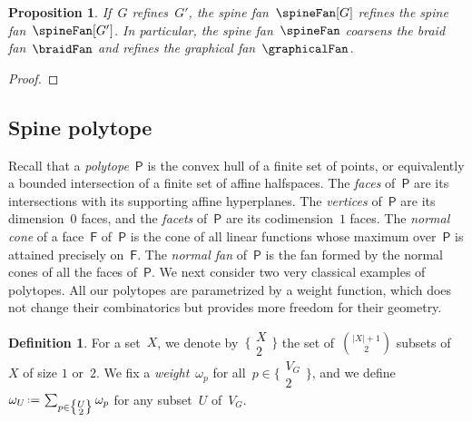 \documentclass{amsart}
\newtheorem{proposition}[theorem]{Proposition}
\theoremstyle{definition}
\newtheorem{definition}[theorem]{Definition}
\newcommand{\eqdef}{\mbox{\,\raisebox{0.2ex}{\scriptsize\ensuremath{\mathrm:}}\ensuremath{=}\,}} %
\newcommand{\darkblue}{\color{darkblue}} %
\newcommand{\defn}[1]{\textsl{\darkblue #1}} %
\newcommand{\vincent}[1]{\todo[color=blue!30]{#1 \\ \hfill --- V.}}
\newcommand{\polytope}[1]{\mathsf{#1}} %
\newcommand{\weight}{\omega} %
\newcommand{\monombinom}[1]{\big\{\!\begin{smallmatrix} #1 \\ 2 \end{smallmatrix}\!\big\}}
\begin{document}
\begin{proposition}
  \label{prop:refinementSpineFan}
  If~$G$ refines~$G'$, the spine fan~$\spineFan[G]$ refines the spine fan~$\spineFan[G']$.
  In particular, the spine fan~$\spineFan$ coarsens the braid fan~$\braidFan$ and refines the graphical fan~$\graphicalFan$.
\end{proposition}

\begin{proof}
  \vincent{todo}
\end{proof}


\subsection{Spine polytope}

Recall that a \defn{polytope}~$\polytope{P}$ is the convex hull of a finite set of points, or equivalently a bounded intersection of a finite set of affine halfspaces.
The \defn{faces} of~$\polytope{P}$ are its intersections with its supporting affine hyperplanes.
The \defn{vertices} of~$\polytope{P}$ are its dimension~$0$ faces, and the \defn{facets} of~$\polytope{P}$ are its codimension~$1$ faces.
The \defn{normal cone} of a face~$\polytope{F}$ of~$\polytope{P}$ is the cone of all linear functions whose maximum over~$\polytope{P}$ is attained precisely on~$\polytope{F}$.
The \defn{normal fan} of~$\polytope{P}$ is the fan formed by the normal cones of all the faces of~$\polytope{P}$.
We next consider two very classical examples of polytopes.
All our polytopes are parametrized by a weight function, which does not change their combinatorics but provides more freedom for their geometry.

\begin{definition}
  \label{def:weight}
  For a set~$X$, we denote by~$\monombinom{X}$ the set of~$\binom{|X|+1}{2}$ subsets of~$X$ of size $1$ or~$2$.
  We fix a \defn{weight}~$\weight_p$ for all~$p \in \monombinom{V_G}$, and we define~$\weight_U \eqdef \sum_{p \in \monombinom{U}} \weight_p$ for any subset~$U$ of~$V_G$.
\end{definition}
\end{document}
